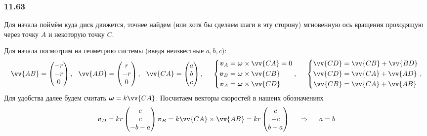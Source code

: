 \subsubsection*{11.63}

Для начала поймём куда диск движется, точнее найдем (или хотя бы сделаем шаги в эту сторону) мгновенную ось вращения проходящую через точку $A$ и некоторую точку $C$.

Для начала посмотрим на геометрию системы (введя неизвестные $a, b, c$):
\begin{equation*}
    \vv{AB} = \begin{pmatrix}
        -r \\ -r \\ 0
    \end{pmatrix},
    \hspace{0.25cm} 
    \vv{AD} = \begin{pmatrix}
        r \\ -r \\ 0
    \end{pmatrix},
    \hspace{0.25cm} 
        \vv{CA} = \begin{pmatrix}
        a \\ b \\ c
    \end{pmatrix},
    \hspace{0.5cm} 
    \left\{\begin{aligned}
    \vc{v}_A &= \vc{\omega} \times \vv{CA} = 0\\
    \vc{v}_B &= \vc{\omega} \times \vv{CB} \\
    \vc{v}_A &= \vc{\omega} \times \vv{CD}
    \end{aligned}\right.,
    \hspace{0.5cm} 
    \left\{\begin{aligned}
        \vv{CD} &= \vv{CB} + \vv{BD} \\
        \vv{CD} &= \vv{CA} + \vv{AD} \\
        \vv{CB} &= \vv{CA} + \vv{AB}
    \end{aligned}\right.,
\end{equation*}
Для удобства далее будем считать $\vc{\omega} = {k} \vv{CA}$. Посчитаем векторы скоростей в нашеих обозначениях
\begin{equation*}
    \vc{v}_D = kr \begin{pmatrix}
        c \\ c \\ -b - a
    \end{pmatrix}
    \vc{v}_B = k \vv{CA} \times \vv{AB} = k r
    \begin{pmatrix}
        c \\ - c \\ b-a
    \end{pmatrix}
    \hspace{0.5cm} \Rightarrow \hspace{0.5cm} 
    a = b
\end{equation*}
